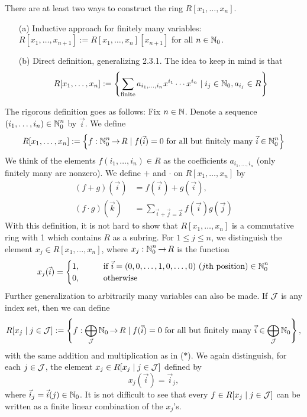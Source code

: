 \documentclass[11pt]{book}
\theoremstyle{definition}   \newtheorem{defn}[counter]{Definition} %
\DeclareMathOperator{\ra}{\rightarrow}   \DeclareMathOperator{\Poly}{\mathbf{P}}   \DeclareMathOperator{\spn}{\textnormal{span}}   \DeclareMathOperator{\aut}{\textnormal{Aut}}
\newcommand{\vs}{\vspace{8pt}}
\numberwithin{counter}{chapter}
\begin{document}
\vs

\begin{remark}
There are at least two ways to construct the ring $R[x_1,\dots,x_n]$.
\begin{enumerate}
\item[(a)] Inductive approach for finitely many variables: $R[x_1,\dots,x_{n+1}] := R[x_1,\dots,x_n][x_{n+1}]$ for all $n \in \operatorname{\mathbb{N}}_0$.
\item[(b)] Direct definition, generalizing 2.3.1. The idea to keep in mind is that
	\[R[x_1,\dots,x_n] := \left\{\sum_{\textnormal{finite}}a_{i_1,\dots,i_n}x^{i_1}\cdots x^{i_n} \mid i_j \in \operatorname{\mathbb{N}}_0, a_{i_j} \in R \right\} \]
\end{enumerate}
The rigorous definition goes as follows: Fix $n \in \operatorname{\mathbb{N}}$. Denote a sequence $(i_1,\dots,i_n) \in \operatorname{\mathbb{N}}_0^n$ by $\vec{i}$. We define
	\[R[x_1,\dots,x_n] := \left\{f : \N_0^n \ra R \mid f(\vec{i})=0 \tn{ for all but finitely many } \vec{i}\in \N_0^n \right\} \]
We think of the elements $f(i_1,\dots,i_n) \in R$ as the coefficients $a_{i_1,\dots,i_n}$ (only finitely many are nonzero). We define $+$ and $\cdot$ on $R[x_1,\dots,x_n]$ by
\begin{align*}
(f+g)(\vec{i}) &= f(\vec{i}) + g(\vec{i}), \\
(f\cdot g)(\vec{k}) &= \sum_{\vec{i}+\vec{j} = \vec{k}} f(\vec{i})g(\vec{j}) \tag{$\ast$}
\end{align*}
With this definition, it is not hard to show that $R[x_1,\dots,x_n]$ is a commutative ring with 1 which contains $R$ as a subring. For $1 \leq j \leq n$, we distinguish the element $x_j \in R[x_1,\dots,x_n]$, where $x_j : \N_0^n \ra R$ is the function
	\[x_j(\vec{i}) = \begin{cases}
						1, \qquad & \textnormal{if } \vec{i} = (0,0,\dots,1,0,\dots,0)\ (j\textnormal{th position}) \in \operatorname{\mathbb{N}}_0^n  \\
						0, & \textnormal{otherwise}
	\end{cases} \]
Further generalization to arbitrarily many variables can also be made. If $\mathcal{J}$ is any index set, then we can define
\[R[x_j \mid j \in \mc{J}] := \left\{f : \bigoplus_{\mc{J}}\N_0 \ra R \mid f(\vec{i})=0 \tn{ for all but finitely many } \vec{i} \in \bigoplus_{\mc{J}}\N_0 \right\}, \]
with the same addition and multiplication as in ($\ast$). We again distinguish, for each $j \in \mathcal{J}$, the element $x_j \in R[x_j \mid j \in \mathcal{J}]$ defined by
	\[x_j (\vec{i}) = \vec{i}_j, \]
where $\vec{i}_j = \vec{i}(j) \in \operatorname{\mathbb{N}}_0$. It is not difficult to see that every $f \in R[x_j \mid j \in \mathcal{J}]$ can be written as a finite linear combination of the $x_j$'s.
\end{remark}
\end{document}
